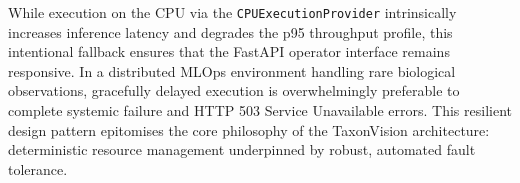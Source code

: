 While execution on the CPU via the \texttt{CPUExecutionProvider} intrinsically increases inference latency and degrades the p95 throughput profile, this intentional fallback ensures that the FastAPI operator interface remains responsive. In a distributed MLOps environment handling rare biological observations, gracefully delayed execution is overwhelmingly preferable to complete systemic failure and HTTP 503 Service Unavailable errors. This resilient design pattern epitomises the core philosophy of the TaxonVision architecture: deterministic resource management underpinned by robust, automated fault tolerance.
